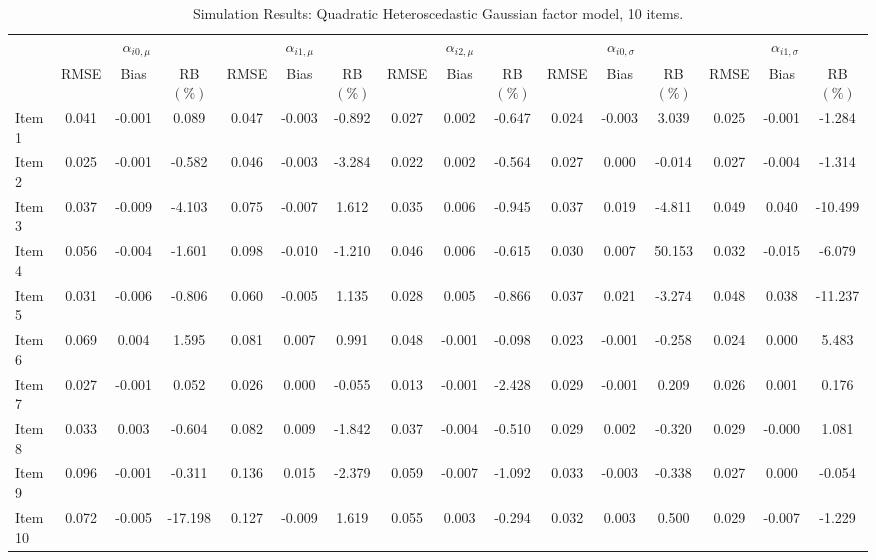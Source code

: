 \documentclass[11pt, a4paper]{article}
\begin{document}
\begin{table}[h!]
{{\begin{tabular}{lccccccccccccccc}
\cmidrule(lr){2-16}
& \multicolumn{3}{c}{$\alpha_{i0,\mu}$} & \multicolumn{3}{c}{$\alpha_{i1,\mu}$} & \multicolumn{3}{c}{$\alpha_{i2,\mu}$} & \multicolumn{3}{c}{$\alpha_{i0,\sigma}$} & \multicolumn{3}{c}{$\alpha_{i1,\sigma}$}\\ 
& RMSE & Bias & RB $(\%)$ & RMSE & Bias & RB $(\%)$ & RMSE & Bias & RB $(\%)$ & RMSE & Bias & RB $(\%)$ & RMSE & Bias & RB $(\%)$ \\ \cmidrule(lr){2-4} \cmidrule(lr){5-7} \cmidrule(lr){8-10} \cmidrule(lr){11-13} \cmidrule(lr){14-16}
Item 1 & 0.041 & -0.001 & 0.089 & 0.047 & -0.003 & -0.892 & 0.027 & 0.002 & -0.647 & 0.024 & -0.003 & 3.039 & 0.025 & -0.001 & -1.284 \\ 
Item 2 & 0.025 & -0.001 & -0.582 & 0.046 & -0.003 & -3.284 & 0.022 & 0.002 & -0.564 & 0.027 & 0.000 & -0.014 & 0.027 & -0.004 & -1.314 \\ 
Item 3 & 0.037 & -0.009 & -4.103 & 0.075 & -0.007 & 1.612 & 0.035 & 0.006 & -0.945 & 0.037 & 0.019 & -4.811 & 0.049 & 0.040 & -10.499 \\ 
Item 4 & 0.056 & -0.004 & -1.601 & 0.098 & -0.010 & -1.210 & 0.046 & 0.006 & -0.615 & 0.030 & 0.007 & 50.153 & 0.032 & -0.015 & -6.079 \\ 
Item 5 & 0.031 & -0.006 & -0.806 & 0.060 & -0.005 & 1.135 & 0.028 & 0.005 & -0.866 & 0.037 & 0.021 & -3.274 & 0.048 & 0.038 & -11.237 \\ 
Item 6 & 0.069 & 0.004 & 1.595 & 0.081 & 0.007 & 0.991 & 0.048 & -0.001 & -0.098 & 0.023 & -0.001 & -0.258 & 0.024 & 0.000 & 5.483 \\ 
Item 7 & 0.027 & -0.001 & 0.052 & 0.026 & 0.000 & -0.055 & 0.013 & -0.001 & -2.428 & 0.029 & -0.001 & 0.209 & 0.026 & 0.001 & 0.176 \\ 
Item 8 & 0.033 & 0.003 & -0.604 & 0.082 & 0.009 & -1.842 & 0.037 & -0.004 & -0.510 & 0.029 & 0.002 & -0.320 & 0.029 & -0.000 & 1.081 \\ 
Item 9 & 0.096 & -0.001 & -0.311 & 0.136 & 0.015 & -2.379 & 0.059 & -0.007 & -1.092 & 0.033 & -0.003 & -0.338 & 0.027 & 0.000 & -0.054 \\ 
Item 10 & 0.072 & -0.005 & -17.198 & 0.127 & -0.009 & 1.619 & 0.055 & 0.003 & -0.294 & 0.032 & 0.003 & 0.500 & 0.029 & -0.007 & -1.229 \\ 
\cmidrule(lr){2-16}
\end{tabular}%
} %
} %
\caption{Simulation Results: Quadratic Heteroscedastic Gaussian factor model, 10 items.}
\label{tab:A1Sim1b}
\end{table}
\end{document}
